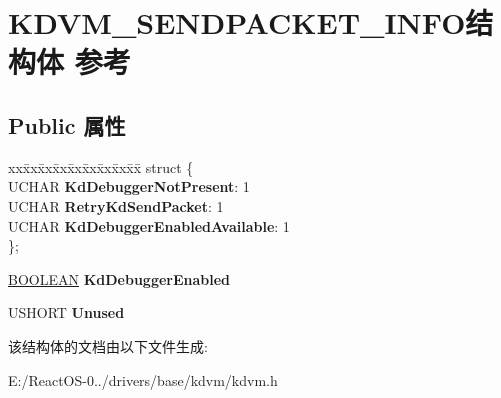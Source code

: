 \hypertarget{struct_k_d_v_m___s_e_n_d_p_a_c_k_e_t___i_n_f_o}{}\section{K\+D\+V\+M\+\_\+\+S\+E\+N\+D\+P\+A\+C\+K\+E\+T\+\_\+\+I\+N\+F\+O结构体 参考}
\label{struct_k_d_v_m___s_e_n_d_p_a_c_k_e_t___i_n_f_o}
\subsection*{Public 属性}
\begin{DoxyCompactItemize}
\item 
\mbox{\label{struct_k_d_v_m___s_e_n_d_p_a_c_k_e_t___i_n_f_o_a1286e698cc66e4137e703d4804113932}} 
\begin{tabbing}
xx\=xx\=xx\=xx\=xx\=xx\=xx\=xx\=xx\=\kill
struct \{\\
\>UCHAR {\bfseries KdDebuggerNotPresent}: 1\\
\>UCHAR {\bfseries RetryKdSendPacket}: 1\\
\>UCHAR {\bfseries KdDebuggerEnabledAvailable}: 1\\
\}; \\

\end{tabbing}\item 
\mbox{\label{struct_k_d_v_m___s_e_n_d_p_a_c_k_e_t___i_n_f_o_a680361ddc5397c2627def137e30b96da}} 
\hyperlink{_processor_bind_8h_a112e3146cb38b6ee95e64d85842e380a}{B\+O\+O\+L\+E\+AN} {\bfseries Kd\+Debugger\+Enabled}
\item 
\mbox{\label{struct_k_d_v_m___s_e_n_d_p_a_c_k_e_t___i_n_f_o_a5a507a022986f90671e24968483d3b07}} 
U\+S\+H\+O\+RT {\bfseries Unused}
\end{DoxyCompactItemize}


该结构体的文档由以下文件生成\+:\begin{DoxyCompactItemize}
\item 
E\+:/\+React\+O\+S-\/0../drivers/base/kdvm/kdvm.\+h\end{DoxyCompactItemize}
